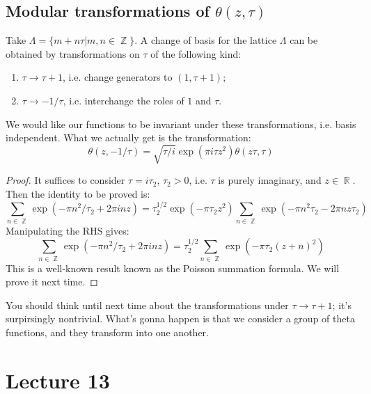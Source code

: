 \documentclass[12 pt]{article}
\DeclareMathOperator {\R} {\mathbb{R}}
\DeclareMathOperator {\Z} {\mathbb{Z}}
\theoremstyle{plain}
\theoremstyle{definition}
\theoremstyle{remark}
\begin{document}
\subsection*{Modular transformations of $\theta(z, \tau)$}
Take $\Lambda = \{ m + n \tau | m,n\in \Z \}$. A change of basis for the lattice $\Lambda$ can be obtained by transformations on $\tau$ of the following kind:
\begin{enumerate}
\item $ \tau \to \tau + 1$, i.e. change generators to $(1, \tau + 1)$;
\item $\tau \to - 1/\tau$, i.e. interchange the roles of $1$ and $\tau$.
\end{enumerate}
We would like our functions to be invariant under these transformations, i.e. basis independent. What we actually get is the transformation:
\[   \theta(z, -1/\tau) = \sqrt{\tau/i} \exp(\pi i \tau z^2)\theta(z\tau, \tau)  \]
\begin{proof}
It suffices to consider $\tau = i \tau_2$, $\tau_2>0$, i.e. $\tau$ is purely imaginary, and $z\in \R$. Then the identity to be proved is:
\[      \sum_{n\in \Z}  \exp(- \pi n^2 /\tau_2 + 2\pi i nz)  = \tau_2^{1/2} \exp(-\pi \tau_2z^2) \sum_{n\in \Z} \exp(-\pi n^2 \tau_2 - 2\pi n z \tau_2)  \]
Manipulating the RHS gives:
\[       \sum_{n\in \Z}  \exp(- \pi n^2 /\tau_2 + 2\pi i nz) = \tau_2^{1/2} \sum_{n\in \Z} \exp(-\pi \tau_2(z+n)^2)    \]
This is a well-known result known as the Poisson summation formula. We will prove it next time.
\end{proof}
You should think until next time about the transformations under $\tau \to \tau + 1$; it's surpirsingly nontrivial. What's gonna happen is that we consider a group of theta functions, and they transform into one another.

\section*{Lecture 13}
\end{document}
